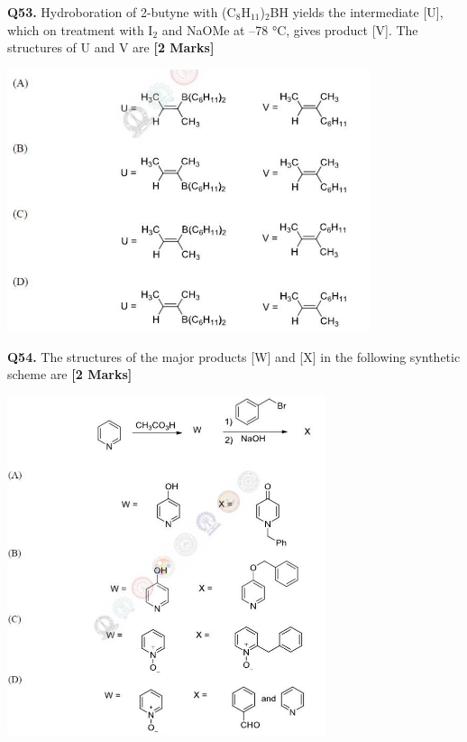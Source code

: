 \documentclass[11pt]{article}
\newcommand{\questionb}[2]{
    \noindent\textbf{Q#2.} #1 \hfill \textbf{[2 Marks]}
}
\begin{document}
\questionb{Hydroboration of 2-butyne with (C\(_8\)H\(_{11}\))\(_2\)BH yields the intermediate [U], which on treatment with I\(_2\) and NaOMe at –78 °C, gives product [V]. The structures of U and V are}{53}
\begin{center}
\includegraphics[width=0.8\textwidth]{figures/53.png}
\end{center}
\vspace{0.5cm}

\questionb{The structures of the major products [W] and [X] in the following synthetic scheme are}{54}
\begin{center}
\includegraphics[width=0.7\textwidth]{figures/54.png}
\end{center}
\vspace{0.5cm}
\end{document}
